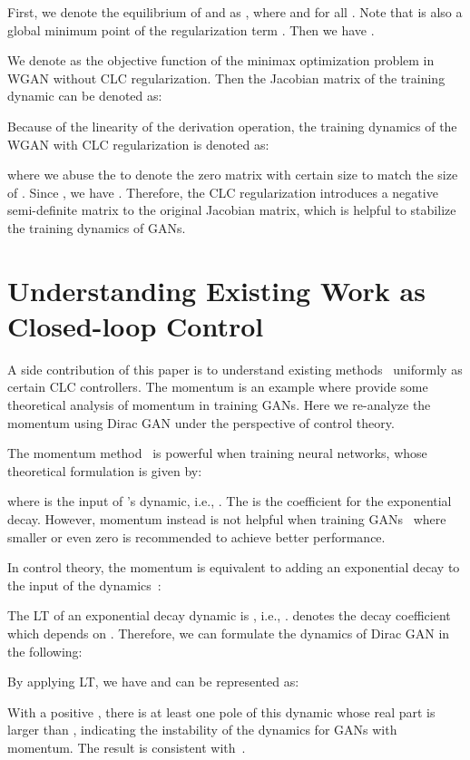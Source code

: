 \documentclass{article}
\theoremstyle{definition}
\begin{document}
First, we denote the equilibrium of  and  as , where  and  for all . Note that  is also a global minimum point of the regularization term . Then we have .

We denote  as the objective function of the minimax optimization problem in WGAN without CLC regularization. Then the Jacobian matrix of the training dynamic can be denoted as:

Because of the linearity of the derivation operation, the training dynamics of the WGAN with CLC regularization is denoted as:

where we abuse the  to denote the zero matrix with certain size to match the size of .
Since , we have . Therefore, the CLC regularization introduces a negative semi-definite matrix to the original Jacobian matrix, which is helpful to stabilize the training dynamics of GANs.


\section{Understanding Existing Work as Closed-loop Control}


A side contribution of this paper is to understand existing methods~\cite{gidel2018negative} uniformly as certain CLC controllers.
The momentum is an example where \citet{gidel2018negative} provide some theoretical analysis of momentum in training GANs. Here we re-analyze the momentum using Dirac GAN under the perspective of control theory. 

The momentum method~\citep{qian1999momentum} is powerful when training neural networks, whose theoretical formulation is given by:

where  is the input of 's dynamic, i.e., .
The  is the coefficient for the exponential decay.
However, momentum instead is not helpful when training GANs~\cite{radford2015unsupervised,mescheder2018training,brock2018large,gulrajani2017improved} where smaller  or even zero is recommended to achieve better performance.




In control theory, the momentum is equivalent to adding an exponential decay to the input of the dynamics~\citep{an2018pid}:

The LT of an exponential decay dynamic is , i.e., .  denotes the decay coefficient which depends on .
Therefore, we can formulate the dynamics of Dirac GAN in the following:

By applying LT, we have  and  can be represented as:

With a positive , there is at least one pole of this dynamic whose real part is larger than , indicating the instability of the dynamics for GANs with momentum.
The result is consistent with~\cite{gidel2018negative}.
\end{document}
